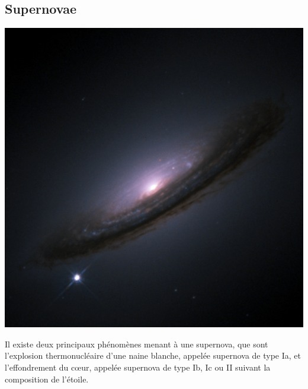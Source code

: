 \documentclass[11pt]{book} %
\begin{document}
\subsection{Supernovae\label{supernova}}
\begin{minipage}{0.3\textwidth}
    \includegraphics[width=1\textwidth]{Pictures/SN1994D.jpg}
\end{minipage}
\hspace{0.025\textwidth}
\begin{minipage}{0.35\textwidth}
    Il existe deux principaux phénomènes menant à une supernova, que sont l'explosion thermonucléaire d'une naine blanche, appelée supernova de type Ia, et l'effondrement du c{\oe}ur, appelée supernova de type Ib, Ic ou II suivant la composition de l'étoile. \cite{sup}
\end{minipage}
\hspace{0.025\textwidth}
\end{document}

